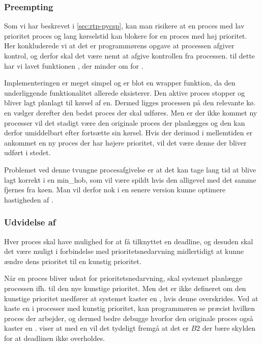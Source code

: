 \subsubsection{Preempting}

Som vi har beskrevet i \cref{sec:rtp-pycsp}, kan  man risikere at en proces med lav prioritet proces og lang kørselstid kan blokere for en proces med høj prioritet. 
Her konkluderede vi at det er programmørens opgave at processen afgiver kontrol, og derfor skal det være nemt at afgive kontrollen fra processen. til dette har vi lavet funktionen , der minder om  for .

Implementeringen er meget simpel og er blot en wrapper funktion, da den underliggende funktionalitet allerede eksisterer. Den aktive proces stopper og bliver lagt planlagt til kørsel af \sched en. Dermed ligges processen på den relevante kø. \Sched en  vælger derefter den bedst proces der skal udføres. Men er  der ikke kommet ny processer vil det stadigt være den originale proces der planlægges og den kan derfor umiddelbart efter fortsætte sin kørsel. Hvis der derimod i mellemtiden er ankommet en ny proces der har højere prioritet, vil det være denne der  bliver udført i stedet.

Problemet ved denne tvungne procesafgivelse er at det kan tage lang tid at blive lagt korrekt i en min\_hob, som vil være spildt hvis den alligevel med det samme fjernes fra køen. Man vil derfor nok i en senere version kunne optimere hastigheden af .

\subsubsection{Udvidelse af }

Hver proces skal have mulighed for at få tilknyttet en deadline, og desuden skal det være muligt i forbindelse med prioritetsnedarvning midlertidigt at kunne ændre dens prioritet til en kunstig prioritet.

Når en proces bliver udsat for prioritetsnedarvning, skal systemet planlægge processen ifh. til den nye kunstige prioritet. Men det er ikke defineret om den kunstige prioritet medfører at systemet kaster en  ,  hvis  denne overskrides. Ved at kaste en  i processer med kunstig prioritet, kan programmøren se præcist hvilken proces der arbejder, og dermed bedre debugge hvorfor den originale proces også kaster en .  viser at med en  vil det tydeligt fremgå at det er $B2$ der bære skylden for at deadlinen ikke overholdes.

